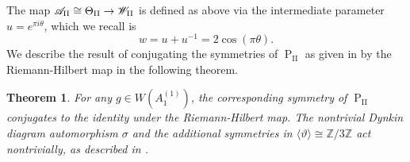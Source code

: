 \documentclass[a4paper,reqno]{amsart}
\numberwithin{equation}{section}
\newcommand{\Z}{\mathbb{Z}}
\newcommand{\pain}[1]{\operatorname{P}_{\mathrm{#1}}}
\newtheorem{theorem}{Theorem}[section]
\numberwithin{equation}{section}
\begin{document}
The map $\mathscr{A}_{\rm{II}}\cong\Theta_{\rm{II}}\to\mathscr{W}_{\rm{II}}$ is defined as above via the intermediate parameter $u = e^{\pi i \theta}$, which we recall is
\begin{equation*} 
    w = u+u^{-1} = 2 \cos (\pi \theta)
    .
\end{equation*}
We describe the result of conjugating the symmetries of $\pain{II}$ as given in  by the Riemann-Hilbert map in the following theorem.

\begin{theorem} \label{thm:symmetryunderRHPII}
    For any $g\in W(A_1^{(1)})$, the corresponding symmetry of $\pain{II}$ conjugates to the identity under the Riemann-Hilbert map.
    The nontrivial Dynkin diagram automorphism $\sigma$ and the additional symmetries in $\langle\vartheta\rangle \cong\Z/3\Z$ act nontrivially, as described in .
\end{theorem}
\end{document}
